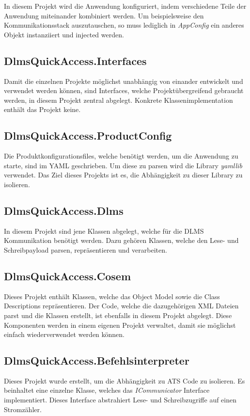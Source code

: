 In diesem Projekt wird die Anwendung konfiguriert, indem verschiedene Teile der Anwendung miteinander kombiniert werden.
Um beispielsweise den Kommunikationsstack auszutauschen, so muss lediglich in \textit{AppConfig} ein anderes Objekt instanziiert und injected werden.

\subsection{DlmsQuickAccess.Interfaces}
Damit die einzelnen Projekte möglichst unabhängig von einander entwickelt und verwendet werden können, sind Interfaces, welche Projektübergreifend gebraucht werden, in diesem Projekt zentral abgelegt.
Konkrete Klassenimplementation enthält das Projekt keine.

\subsection{DlmsQuickAccess.ProductConfig}
Die Produktkonfigurationsfiles, welche benötigt werden, um die Anwendung zu starte, sind im YAML geschrieben.
Um diese zu parsen wird die Library \textit{yamllib} verwendet.
Das Ziel dieses Projekts ist es, die Abhängigkeit zu dieser Library zu isolieren.

\subsection{DlmsQuickAccess.Dlms}
In diesem Projekt sind jene Klassen abgelegt, welche für die \ac{DLMS} Kommunikation benötigt werden.
Dazu gehören Klassen, welche den Lese- und Schreibpayload parsen, repräsentieren und verarbeiten.

\subsection{DlmsQuickAccess.Cosem}
Dieses Projekt enthält Klassen, welche das Object Model sowie die Class Descriptions repräsentieren.
Der Code, welche die dazugehörigen XML Dateien parst und die Klassen erstellt, ist ebenfalls in diesem Projekt abgelegt.
Diese Komponenten werden in einem eigenen Projekt verwaltet, damit sie möglichst einfach wiederverwendet werden können.

\subsection{DlmsQuickAccess.Befehlsinterpreter}
Dieses Projekt wurde erstellt, um die Abhängigkeit zu \ac{ATS} Code zu isolieren.
Es beinhaltet eine einzelne Klasse, welches das \textit{ICommunicator} Interface implementiert.
Dieses Interface abstrahiert Lese- und Schreibzugriffe auf einen Stromzähler.

